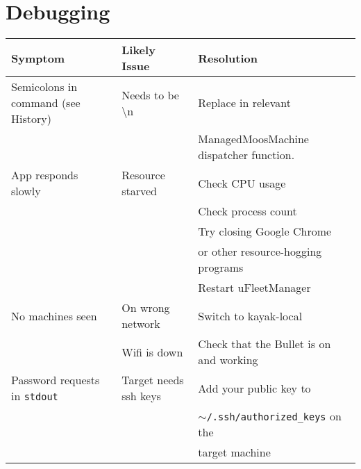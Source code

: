 \documentclass[11pt]{article}
\begin{document}
\section{Debugging}
\begin{tabular}{l|l|l}
Symptom & Likely Issue & Resolution\\
\hline
Semicolons in command (see History) & Needs to be {\textbackslash}n & Replace in relevant\\&& ManagedMoosMachine dispatcher function.\\
App responds slowly & Resource starved & Check CPU usage\\
&& Check process count\\
&& Try closing Google Chrome\\
&& or other resource-hogging programs\\
&& Restart uFleetManager\\
No machines seen & On wrong network & Switch to kayak-local\\
& Wifi is down & Check that the Bullet is on and working\\
Password requests in \texttt{stdout} & Target needs ssh keys & Add your public key to \\ 
&&\texttt{$\sim$/.ssh/authorized\_keys} on the\\
&& target machine
\end{tabular}
\end{document}

